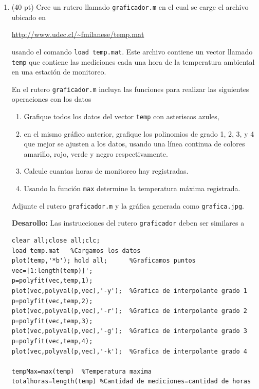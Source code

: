 \documentclass[11pt]{article}
\begin{document}
\begin{enumerate}
\item (40 pt) Cree un rutero llamado \texttt{graficador.m} en el cual se carge el archivo ubicado en
\begin{center}
\url{http://www.udec.cl/~fmilanese/temp.mat}
\end{center}
usando el comando \texttt{load temp.mat}. Este archivo contiene un vector llamado \texttt{temp} que contiene las mediciones cada una hora de la temperatura ambiental en una estaci\'on de monitoreo.

En el rutero \texttt{graficador.m} incluya las funciones para realizar las siguientes operaciones con los datos
\begin{enumerate}
	\item Grafique todos los datos del vector \texttt{temp} con asteriscos azules,
    \item en el mismo gráfico anterior, grafique los polinomios de grado 1, 2, 3, y 4 que mejor se ajusten a los datos, usando una l\'inea continua de colores amarillo, rojo, verde y negro respectivamente.
    \item Calcule cuantas horas de monitoreo hay registradas.
    \item Usando la funci\'on \texttt{max} determine la temperatura m\'axima registrada.
\end{enumerate}
Adjunte el rutero \texttt{graficador.m} y la gr\'afica generada como \texttt{grafica.jpg}.

 \textbf{Desarollo:} 
Las instrucciones del rutero \texttt{graficador} deben ser similares a

 \begin{minipage}{0.8\textwidth}
\begin{lstlisting}
clear all;close all;clc;
load temp.mat   %Cargamos los datos
plot(temp,'*b'); hold all;    	%Graficamos puntos
vec=[1:length(temp)]';
p=polyfit(vec,temp,1);
plot(vec,polyval(p,vec),'-y');  %Grafica de interpolante grado 1
p=polyfit(vec,temp,2);
plot(vec,polyval(p,vec),'-r');  %Grafica de interpolante grado 2
p=polyfit(vec,temp,3);
plot(vec,polyval(p,vec),'-g');  %Grafica de interpolante grado 3
p=polyfit(vec,temp,4);
plot(vec,polyval(p,vec),'-k');  %Grafica de interpolante grado 4

tempMax=max(temp)  %Temperatura maxima
totalhoras=length(temp) %Cantidad de mediciones=cantidad de horas
\end{lstlisting}
\end{minipage}
\fbox{30pt}


\end{enumerate}
\end{document}
